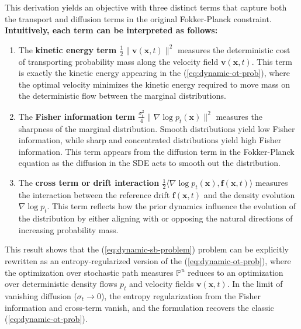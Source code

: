 \documentclass{article}
\begin{document}
This derivation yields an objective with three distinct terms that capture both the transport and diffusion terms in the original Fokker-Planck constraint. \textbf{Intuitively, each term can be interpreted as follows:}
\begin{enumerate}
\item[(i)] The \textbf{kinetic energy term $\frac{1}{2}\|\boldsymbol{v}(\boldsymbol{x},t)\|^2$} measures the deterministic cost of transporting probability mass along the velocity field $\boldsymbol{v}(\boldsymbol{x},t)$. This term is exactly the kinetic energy appearing in the (\ref{eq:dynamic-ot-prob}), where the optimal velocity minimizes the kinetic energy required to move mass on the deterministic flow between the marginal distributions.
\item[(ii)] The \textbf{Fisher information term $\frac{\sigma^2_t}{4}\|\nabla \log p_t(\boldsymbol{x})\|^2$} measures the sharpness of the marginal distribution. Smooth distributions yield low Fisher information, while sharp and concentrated distributions yield high Fisher information. This term appears from the diffusion term in the Fokker-Planck equation as the diffusion in the SDE acts to smooth out the distribution.
\item[(iii)] The \textbf{cross term or drift interaction $\frac{1}{2}\langle\nabla \log p_t(\boldsymbol{x}), \boldsymbol{f}(\boldsymbol{x},t)\rangle$} measures the interaction between the reference drift $\boldsymbol{f}(\boldsymbol{x},t)$ and the density evolution $\nabla \log p_t$. This term reflects how the prior dynamics influence the evolution of the distribution by either aligning with or opposing the natural directions of increasing probability mass.
\end{enumerate}

This result shows that the (\ref{eq:dynamic-sb-problem}) problem can be explicitly rewritten as an entropy-regularized version of the (\ref{eq:dynamic-ot-prob}), where the optimization over stochastic path measures $\mathbb{P}^u$ reduces to an optimization over deterministic density flows $p_t$ and velocity fields $\boldsymbol{v}(\boldsymbol{x},t)$. In the limit of vanishing diffusion ($\sigma_t\to 0$), the entropy regularization from the Fisher information and cross-term vanish, and the formulation recovers the classic (\ref{eq:dynamic-ot-prob}).
\end{document}
